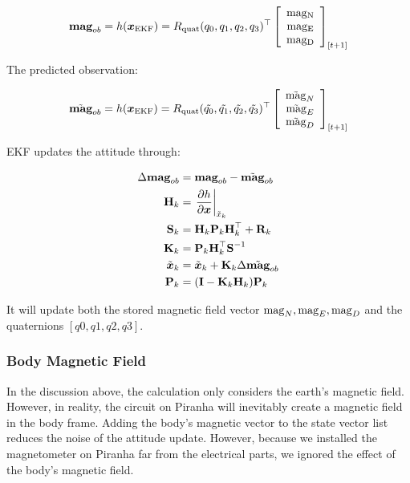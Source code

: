 \begin{equation}
    \textbf{mag}_{ob}=h(\boldsymbol{x}_{\rm EKF})=R_{\rm quat}(q_0,q_1,q_2,q_3)^\top \left[\begin{array}{c}
            \rm mag_N  \\
            \rm mag_E  \\
            \rm mag_D
        \end{array}\right]_{[t+1]}
\end{equation}

The predicted observation:

\begin{equation}
    \Tilde{\textbf{mag}}_{ob}=h(\boldsymbol{x}_{\rm EKF})=R_{\rm quat}(\Tilde{q_0},\Tilde{q_1},\Tilde{q_2},\Tilde{q_3})^\top \left[\begin{array}{c}
            \Tilde{\rm mag}_N  \\
            \Tilde{\rm mag}_E  \\
            \Tilde{\rm mag}_D
        \end{array}\right]_{[t+1]}
\end{equation}

EKF updates the attitude through:

\begin{align}
    \Delta \textbf{mag}_{ob} & =\textbf{mag}_{ob}-\Tilde{\textbf{mag}}_{ob} \\
    \textbf{H}_k &=\left.\frac{\partial h}{\partial \boldsymbol{x}}\right|_{\Tilde{x}_k} \\
    \textbf{S}_k &=\textbf{H}_k\textbf{P}_k\textbf{H}_k^\top+\textbf{R}_k \\
    \textbf{K}_k &=\textbf{P}_k\textbf{H}_k^\top\textbf{S}^{-1} \\
    \Tilde{\boldsymbol{x}}_k &=\Tilde{\boldsymbol{x}}_k+\textbf{K}_k\Delta\Tilde{\textbf{mag}}_{ob} \\
    \textbf{P}_k &=(\textbf{I}-\textbf{K}_k\textbf{H}_k)\textbf{P}_k
\end{align}

It will update both the stored magnetic field vector ${\rm mag}_N, {\rm mag}_E, {\rm mag}_D$ and the quaternions $[q0, q1, q2, q3]$.

\subsubsection{Body Magnetic Field}

In the discussion above, the calculation only considers the earth's magnetic field. However, in reality, the circuit on Piranha will inevitably create a magnetic field in the body frame. Adding the body's magnetic vector to the state vector list reduces the noise of the attitude update. However, because we installed the magnetometer on Piranha far from the electrical parts, we ignored the effect of the body's magnetic field. 


